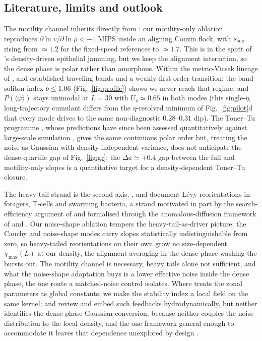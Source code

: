 \documentclass[11pt,a4paper]{article}
\begin{document}
\subsection{Literature, limits and outlook}
\label{sec:disc-literature}

The motility channel inherits directly from
\citet{CatesTailleur2015}: our motility-only ablation reproduces
$\partial \ln v / \partial \ln \rho < -1$ MIPS inside an
aligning Couzin flock, with $s_{\rm sep}$ rising from $\simeq
1.2$ for the fixed-speed references to $\simeq 1.7$. This is in
the spirit of \citet{Bi2016}'s density-driven epithelial
jamming, but we keep the alignment interaction, so the dense
phase is polar rather than amorphous. Within the metric-Vicsek
lineage of \citet{Vicsek1995}, \citet{Gregoire2004} and
\citet{Chate2008} established traveling bands and a weakly
first-order transition; the band-soliton index $b \le 1.06$
(Fig.~\ref{fig:profile}) shows we never reach that regime, and
$P(\langle\varphi\rangle)$ stays unimodal at $L = 30$ with $U_4
\simeq 0.65$ in both modes (this single-$\eta$, long-trajectory
cumulant differs from
the $\eta$-resolved minimum of Fig.~\ref{fig:pilot}d that every
mode drives to the same non-diagnostic $0.28$--$0.31$ dip). The
Toner--Tu programme \citep{TonerTu1995, TonerTu1998,
TonerTu2012}, whose predictions have since been assessed
quantitatively against large-scale simulation
\citep{Mahault2019}, gives the same continuous polar order but,
treating the noise as Gaussian with density-independent variance,
does not anticipate the dense-quartile gap of
Fig.~\ref{fig:gr}; the $\Delta a \simeq +0.4$ gap between the
full and motility-only slopes is a quantitative target for a
density-dependent Toner--Tu closure.

The heavy-tail strand is the second axis. \citet{Reynolds2018},
\citet{Harris2012} and \citet{Ariel2015} document L\'evy
reorientations in foragers, T-cells and swarming bacteria, a
strand motivated in part by the search-efficiency argument of
\citet{Viswanathan1999} and formalised through the anomalous-diffusion
framework of \citet{Metzler2000} and \citet{Zaburdaev2015}. Our
noise-shape ablation tempers the heavy-tail-as-driver picture:
the Cauchy and noise-shape modes carry slopes statistically
indistinguishable from zero, so heavy-tailed reorientations on
their own grow no size-dependent $\chi_{\max}(L)$ at our
density, the alignment averaging in the dense phase washing the
bursts out. The motility channel is necessary, heavy tails alone
not sufficient, and what the noise-shape adaptation buys is a
lower effective noise inside the dense
phase, the one route a matched-noise control isolates. Where
\citet{Couzin2002} treats the zonal parameters as global
constants, we make the stability index a local field on the same
kernel; \citet{Bechinger2016} and \citet{Marchetti2013} review
and embed such feedbacks hydrodynamically, but neither
identifies the dense-phase Gaussian conversion, because neither
couples the noise distribution to the local density, and the one
framework general enough to accommodate it leaves that
dependence unexplored by design \citep{Clusella2021}.
\end{document}
